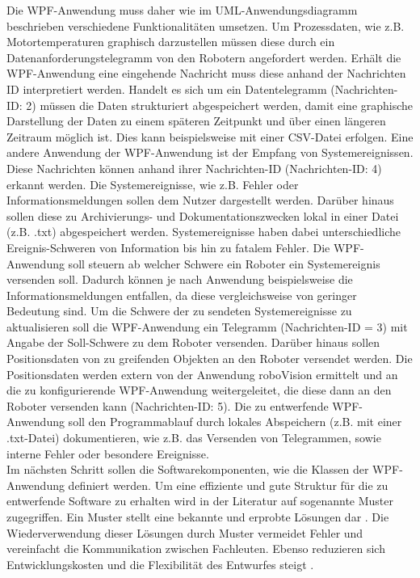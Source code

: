 \documentclass[ a4paper,
                oneside,
                toc=bibliography,
                toc=listof
                ]{scrbook}
\begin{document}
	\noindent
	Die WPF-Anwendung muss daher wie im UML-Anwendungsdiagramm beschrieben verschiedene Funktionalitäten umsetzen. Um Prozessdaten, wie z.B. Motortemperaturen graphisch darzustellen müssen diese durch ein Datenanforderungstelegramm von den Robotern angefordert werden. Erhält die WPF-Anwendung eine eingehende Nachricht muss diese anhand der Nachrichten ID interpretiert werden. Handelt es sich um ein Datentelegramm (Nachrichten-ID: 2) müssen die Daten strukturiert abgespeichert werden, damit eine graphische Darstellung der Daten zu einem späteren Zeitpunkt und über einen längeren Zeitraum möglich ist. Dies kann beispielsweise mit einer CSV-Datei erfolgen. Eine andere Anwendung der WPF-Anwendung ist der Empfang von Systemereignissen. Diese Nachrichten können anhand ihrer Nachrichten-ID (Nachrichten-ID: 4) erkannt werden. Die Systemereignisse, wie z.B. Fehler oder Informationsmeldungen sollen dem Nutzer dargestellt werden. Darüber hinaus sollen diese zu Archivierungs- und Dokumentationszwecken lokal in einer Datei (z.B. .txt) abgespeichert werden. Systemereignisse haben dabei unterschiedliche Ereignis-Schweren von Information bis hin zu fatalem Fehler. Die WPF-Anwendung soll steuern ab welcher Schwere ein Roboter ein Systemereignis versenden soll. Dadurch können je nach Anwendung beispielsweise die Informationsmeldungen entfallen, da diese vergleichsweise von geringer Bedeutung sind. Um die Schwere der zu sendeten Systemereignisse zu aktualisieren soll die WPF-Anwendung ein Telegramm (Nachrichten-ID = 3) mit Angabe der Soll-Schwere zu dem Roboter versenden. Darüber hinaus sollen Positionsdaten von zu greifenden Objekten an den Roboter versendet werden. Die Positionsdaten werden extern von der Anwendung \glqq roboVision\grqq{} ermittelt und an die zu konfigurierende WPF-Anwendung weitergeleitet, die diese dann an den Roboter versenden kann (Nachrichten-ID: 5). Die zu entwerfende WPF-Anwendung soll den Programmablauf durch lokales Abspeichern (z.B. mit einer .txt-Datei) dokumentieren, wie z.B. das Versenden von Telegrammen, sowie interne Fehler oder besondere Ereignisse.\\
	Im nächsten Schritt sollen die Softwarekomponenten, wie die Klassen der WPF-Anwendung definiert werden. Um eine effiziente und gute Struktur für die zu entwerfende Software zu erhalten wird in der Literatur auf sogenannte Muster zugegriffen. Ein Muster stellt eine bekannte und erprobte Lösungen dar \cite{agileSoftware}. Die Wiederverwendung dieser Lösungen durch Muster vermeidet Fehler und vereinfacht die Kommunikation zwischen Fachleuten. Ebenso reduzieren sich Entwicklungskosten und die Flexibilität des Entwurfes steigt \cite{ArchitekturmusterGoll}.\\
\end{document}
